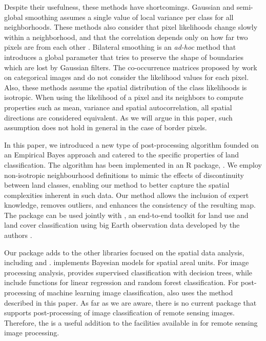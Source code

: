 \documentclass[
  shortnames]{jss}
\begin{document}
Despite their usefulness, these methods have shortcomings. Gaussian and semi-global smoothing assumes a single value of local variance per class for all neighborhoods. These methods also consider that pixel likelihoods change slowly within a neighborhood, and that the correlation depends only on how far two pixels are from each other \citep{Schindler2012}. Bilateral smoothing is an \textit{ad-hoc} method that introduces a global parameter that tries to preserve the shape of boundaries which are lost by Gaussian filters. The co-occurrence matrices proposed by \citet{Huang2014} work on categorical images and do not consider the likelihood values for each pixel. Also, these methods assume the spatial distribution of the class likelihoods is isotropic. When using the likelihood of a pixel and its neighbors to compute properties such as mean, variance and spatial autocorrelation, all spatial directions are considered equivalent. As we will argue in this paper, such assumption does not hold in general in the case of border pixels.

In this paper, we introduced a new type of post-processing algorithm founded on an Empirical Bayes approach and catered to the specific properties of land classification. The algorithm has been implemented in an R package, . We employ non-isotropic neighbourhood definitions to mimic the effects of discontinuity between land classes, enabling our method to better capture the spatial complexities inherent in such data. Our method allows the inclusion of expert knowledge, removes outliers, and enhances the consistency of the resulting map. The  package can be used jointly with , an end-to-end toolkit for land use and land cover classification using big Earth observation data developed by the authors \citep{Simoes2021}.

Our package adds to the other  libraries focused on the spatial data analysis, including  \citep{Bivand2023} and  \citep{Li2022}.  \citep{Lee2013} implements Bayesian models for spatial areal units. For image processing analysis,  \citep{Hijmans2023} provides supervised classification with decision trees, while  \citep{Bivand2023} include functions for linear regression and random forest classification. For post-processing of machine learning image classification,  also uses the method described in this paper. As far as we are aware, there is no current  package that supports post-processing of image classification of remote sensing images. Therefore, the  is a useful addition to the facilities available in  for remote sensing image processing.
\end{document}
